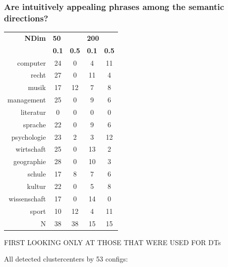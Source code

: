 \subsubsection{Are intuitively appealing phrases among the semantic directions?}

\begin{table}[H]
	\begin{tabular}{rcccc}
	\toprule
	 \textbf{NDim} & \multicolumn{2}{l}{\textbf{50}} & \multicolumn{2}{l}{\textbf{200}} \\
	 & \textbf{0.1} & \textbf{0.5} & \textbf{0.1} & \textbf{0.5}  \\
	\midrule
	computer & 24 & 0 & 4 & 11 \\
	recht & 27 & 0 & 11 & 4 \\
	musik & 17 & 12 & 7 & 8 \\
	management & 25 & 0 & 9 & 6 \\
	literatur & 0 & 0 & 0 & 0 \\
	sprache & 22 & 0 & 9 & 6 \\
	psychologie & 23 & 2 & 3 & 12 \\
	wirtschaft & 25 & 0 & 13 & 2 \\
	geographie & 28 & 0 & 10 & 3 \\
	schule & 17 & 8 & 7 & 6 \\
	kultur & 22 & 0 & 5 & 8 \\
	wissenschaft & 17 & 0 & 14 & 0 \\
	sport & 10 & 12 & 4 & 11 \\
	N & 38 & 38 & 15 & 15 \\
	\bottomrule
\end{tabular}
\end{table}
	

FIRST LOOKING ONLY AT THOSE THAT WERE USED FOR DTs

All detected clustercenters by 53 configs:

